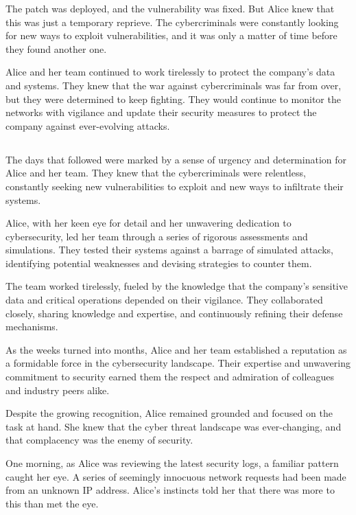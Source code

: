\documentclass{./StyCls/MyArticle}
\begin{document}
The patch was deployed, and the vulnerability was fixed. But Alice knew that this was just a temporary reprieve. The cybercriminals were constantly looking for new ways to exploit vulnerabilities, and it was only a matter of time before they found another one.

Alice and her team continued to work tirelessly to protect the company's data and systems. They knew that the war against cybercriminals was far from over, but they were determined to keep fighting. They would continue to monitor the networks with vigilance and update their security measures to protect the company against ever-evolving attacks.

\subsection{}

The days that followed were marked by a sense of urgency and determination for Alice and her team. They knew that the cybercriminals were relentless, constantly seeking new vulnerabilities to exploit and new ways to infiltrate their systems.

Alice, with her keen eye for detail and her unwavering dedication to cybersecurity, led her team through a series of rigorous assessments and simulations. They tested their systems against a barrage of simulated attacks, identifying potential weaknesses and devising strategies to counter them.

The team worked tirelessly, fueled by the knowledge that the company's sensitive data and critical operations depended on their vigilance. They collaborated closely, sharing knowledge and expertise, and continuously refining their defense mechanisms.

As the weeks turned into months, Alice and her team established a reputation as a formidable force in the cybersecurity landscape. Their expertise and unwavering commitment to security earned them the respect and admiration of colleagues and industry peers alike.

Despite the growing recognition, Alice remained grounded and focused on the task at hand. She knew that the cyber threat landscape was ever-changing, and that complacency was the enemy of security.

One morning, as Alice was reviewing the latest security logs, a familiar pattern caught her eye. A series of seemingly innocuous network requests had been made from an unknown IP address. Alice's instincts told her that there was more to this than met the eye.
\end{document}
